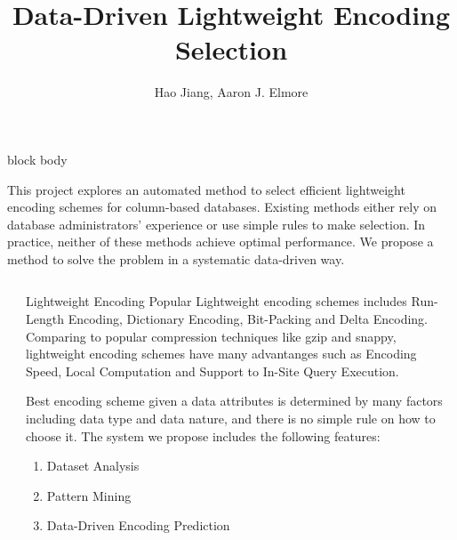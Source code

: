 \documentclass{beamer}
\title{Data-Driven Lightweight Encoding Selection}
\author{Hao Jiang, Aaron J. Elmore} %
\institute{Department of Computer Science\\ The University of Chicago} %
\date{}
\newlength{\sepwid}
\newlength{\onecolwid}
\begin{document}
\begin{frame}[t] %
 
\begin{beamercolorbox}[colsep*=2ex,vmode]{block body}

This project explores an automated method to select efficient lightweight
encoding schemes for column-based databases. Existing
methods either rely on database administrators' experience or use simple rules
to make selection. In practice, neither of these methods achieve optimal
performance. We propose a method to solve the problem in a systematic
data-driven way.
 

\end{beamercolorbox}

\begin{columns}[t] 
\begin{column}{\sepwid}\end{column} %

\begin{column}{\onecolwid} %
          
\begin{block}{Lightweight Encoding}
Popular Lightweight encoding schemes includes Run-Length Encoding, Dictionary
Encoding, Bit-Packing and Delta Encoding. Comparing to popular compression
techniques like gzip and snappy, lightweight encoding schemes have many
advantanges such as Encoding Speed, Local Computation and Support to In-Site
Query Execution.

Best encoding scheme given a data attributes is determined by many
factors including data type and data nature, and there is no simple rule on
how to choose it. The system we propose includes the following features:
\begin{enumerate}\setlength{\itemindent}{1.5em}
  \item Dataset Analysis
  \item Pattern Mining
  \item Data-Driven Encoding Prediction
\end{enumerate}
\end{block}



\end{column}
\end{columns}
\end{frame}
\end{document}
